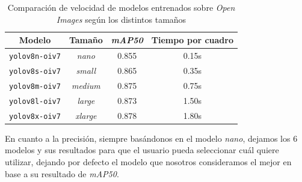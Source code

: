\documentclass[a4paper]{article}
\begin{document}
\begin{table}[H]
\centering
\renewcommand{\arraystretch}{1.3}
\begin{tabular}{c c c c}
 \hline
 Modelo & Tamaño & \textit{mAP50} & Tiempo por cuadro \\
 \hline\hline
 \texttt{yolov8n-oiv7} & \textit{nano}   & 0.855 & 0.15s \\ \hline
 \texttt{yolov8s-oiv7} & \textit{small}  & 0.865 & 0.35s \\ \hline
 \texttt{yolov8m-oiv7} & \textit{medium} & 0.875 & 0.75s \\ \hline
 \texttt{yolov8l-oiv7} & \textit{large}  & 0.873 & 1.50s \\ \hline
 \texttt{yolov8x-oiv7} & \textit{xlarge} & 0.878 & 1.80s \\ \hline
\end{tabular}
\caption{Comparación de velocidad de modelos entrenados sobre \textit{Open Images} según los distintos tamaños}
\end{table}

En cuanto a la precisión, siempre basándonos en el modelo \textit{nano}, dejamos los 6 modelos y sus resultados para que el usuario pueda seleccionar cuál quiere utilizar, dejando por defecto el modelo que nosotros consideramos el mejor en base a su resultado de \textit{mAP50}.

\begin{table}[H]
\renewcommand{\arraystretch}{1.2}
\caption{Comparación de precisión de los modelos finales}
\end{table}
\end{document}
